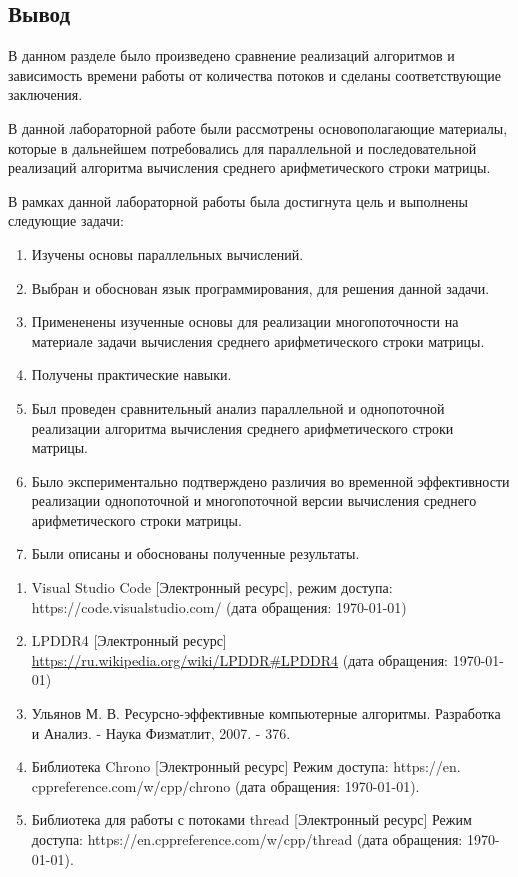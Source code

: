 \subsection{Вывод}

В данном разделе было произведено сравнение реализаций алгоритмов и зависимость времени работы от количества потоков и сделаны соответствующие заключения.


В данной лабораторной работе были рассмотрены основополагающие материалы, которые в дальнейшем потребовались для параллельной и последовательной реализаций алгоритма вычисления среднего арифметического строки матрицы. 

В рамках данной лабораторной работы была достигнута цель и выполнены следующие задачи:

\begin{enumerate}
	\item Изучены основы параллельных вычислений.
	\item Выбран и обоснован язык программирования, для решения данной задачи.
	\item Примененены изученные основы для реализации многопоточности на материале задачи вычисления среднего арифметического строки матрицы.
	\item Получены практические навыки.
	\item Был проведен сравнительный анализ параллельной и однопоточной реализации алгоритма вычисления среднего арифметического строки матрицы.
	\item Было экспериментально подтверждено различия во временной эффективности реализации однопоточной и многопоточной версии вычисления среднего арифметического строки матрицы.
	\item Были описаны и обоснованы полученные результаты.
\end{enumerate}


\begin{enumerate}
	\item Visual Studio Code [Электронный ресурс], режим доступа: https://code.visualstudio.com/ (дата обращения: \today)
	\item LPDDR4 [Электронный ресурс] \url{https://ru.wikipedia.org/wiki/LPDDR#LPDDR4} (дата обращения: \today)
	\item Ульянов М. В. Ресурсно-эффективные компьютерные алгоритмы. Разработка и Анализ. - Наука Физматлит, 2007. - 376.
	\item Библиотека Chrono [Электронный ресурс] Режим доступа: https://en. cppreference.com/w/cpp/chrono (дата обращения: \today).
	\item Библиотека для работы с потоками thread [Электронный ресурс] Режим доступа: https://en.cppreference.com/w/cpp/thread (дата обращения: \today).
\end{enumerate}


